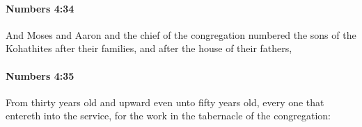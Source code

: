 		\paragraph{Numbers 4:34} %
			\label{NUMBERS-4-34}

			And Moses and Aaron and the chief of the congregation numbered the sons of the Kohathites after their families, and after the house of their fathers,


		\paragraph{Numbers 4:35} %
			\label{NUMBERS-4-35}

			From thirty years old and upward even unto fifty years old, every one that entereth into the service, for the work in the tabernacle of the congregation:


